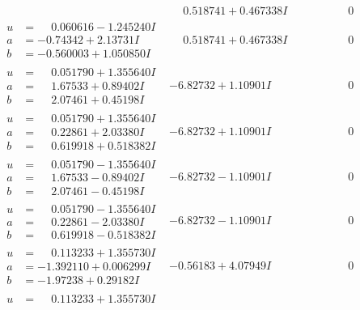 \documentclass[1p]{elsarticle_modified}
\theoremstyle{definition}
\begin{document}
$$\begin{array}{c|c|c}
 & \phantom{-}0.518741 + 0.467338 I & \phantom{-0.000000 } 0 \\ \hline\begin{aligned}
u &= \phantom{-}0.060616 - 1.245240 I \\
a &= -0.74342 + 2.13731 I \\
b &= -0.560003 + 1.050850 I\end{aligned}
 & \phantom{-}0.518741 + 0.467338 I & \phantom{-0.000000 } 0 \\ \hline\begin{aligned}
u &= \phantom{-}0.051790 + 1.355640 I \\
a &= \phantom{-}1.67533 + 0.89402 I \\
b &= \phantom{-}2.07461 + 0.45198 I\end{aligned}
 & -6.82732 + 1.10901 I & \phantom{-0.000000 } 0 \\ \hline\begin{aligned}
u &= \phantom{-}0.051790 + 1.355640 I \\
a &= \phantom{-}0.22861 + 2.03380 I \\
b &= \phantom{-}0.619918 + 0.518382 I\end{aligned}
 & -6.82732 + 1.10901 I & \phantom{-0.000000 } 0 \\ \hline\begin{aligned}
u &= \phantom{-}0.051790 - 1.355640 I \\
a &= \phantom{-}1.67533 - 0.89402 I \\
b &= \phantom{-}2.07461 - 0.45198 I\end{aligned}
 & -6.82732 - 1.10901 I & \phantom{-0.000000 } 0 \\ \hline\begin{aligned}
u &= \phantom{-}0.051790 - 1.355640 I \\
a &= \phantom{-}0.22861 - 2.03380 I \\
b &= \phantom{-}0.619918 - 0.518382 I\end{aligned}
 & -6.82732 - 1.10901 I & \phantom{-0.000000 } 0 \\ \hline\begin{aligned}
u &= \phantom{-}0.113233 + 1.355730 I \\
a &= -1.392110 + 0.006299 I \\
b &= -1.97238 + 0.29182 I\end{aligned}
 & -0.56183 + 4.07949 I & \phantom{-0.000000 } 0 \\ \hline\begin{aligned}
u &= \phantom{-}0.113233 + 1.355730 I \\

\end{aligned}
\end{array}$$
\end{document}
